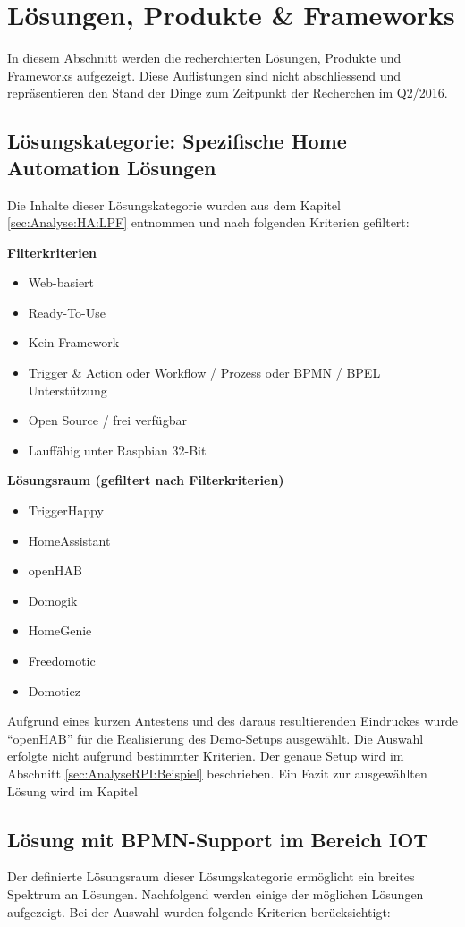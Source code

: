 \section{Lösungen, Produkte \& Frameworks }
In diesem Abschnitt werden die recherchierten Lösungen, Produkte und Frameworks aufgezeigt. Diese Auflistungen sind nicht abschliessend und repräsentieren den Stand der Dinge zum Zeitpunkt der Recherchen im Q2/2016.

\subsection{Lösungskategorie: Spezifische Home Automation Lösungen}
Die Inhalte dieser Lösungskategorie wurden aus dem Kapitel \ref{sec:Analyse:HA:LPF}  entnommen und nach folgenden Kriterien gefiltert:

\textbf{Filterkriterien}
\begin{itemize}
\item Web-basiert
\item Ready-To-Use
\item Kein Framework
\item Trigger \& Action oder Workflow  / Prozess oder BPMN / BPEL Unterstützung
\item Open Source / frei verfügbar
\item Lauffähig unter Raspbian 32-Bit
\end{itemize}

\textbf{Lösungsraum (gefiltert nach Filterkriterien)}
\begin{itemize}
\item TriggerHappy
\item HomeAssistant
\item openHAB
\item Domogik
\item HomeGenie
\item Freedomotic
\item Domoticz
\end{itemize}

Aufgrund eines kurzen Antestens und des daraus resultierenden Eindruckes wurde "`openHAB"' für die Realisierung des Demo-Setups ausgewählt. Die Auswahl erfolgte nicht aufgrund bestimmter Kriterien. Der genaue Setup wird im Abschnitt \ref{sec:AnalyseRPI:Beispiel}  beschrieben. Ein Fazit zur ausgewählten Lösung wird im Kapitel 


\subsection{Lösung mit BPMN-Support im Bereich IOT}
Der definierte Lösungsraum dieser Lösungskategorie ermöglicht ein breites Spektrum an Lösungen. Nachfolgend werden einige der möglichen Lösungen aufgezeigt. Bei der Auswahl wurden folgende Kriterien berücksichtigt:

